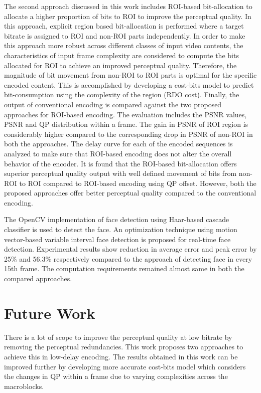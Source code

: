 The second approach discussed in this work includes ROI-based bit-allocation to allocate a higher proportion of bits to ROI to improve the perceptual quality. In this approach, explicit region based bit-allocation is performed where a target bitrate is assigned to ROI and non-ROI parts independently. In order to make this approach more robust across different classes of input video contents, the characteristics of input frame complexity are considered to compute the bits allocated for ROI to achieve an improved perceptual quality. Therefore, the magnitude of bit movement from non-ROI to ROI parts is optimal for the specific encoded content. This is accomplished by developing a cost-bits model to predict bit-consumption using the complexity of the region (RDO cost). Finally, the output of conventional encoding is compared against the two proposed approaches for ROI-based encoding. The evaluation includes the PSNR values, PSNR and QP distribution within a frame. The gain in PSNR of ROI region is considerably higher compared to the corresponding drop in PSNR of non-ROI in both the approaches. The delay curve for each of the encoded sequences is analyzed to make sure that ROI-based encoding does not alter the overall behavior of the encoder. It is found that the ROI-based bit-allocation offers superior perceptual quality output with well defined movement of bits from non-ROI to ROI compared to ROI-based encoding using QP offset. However, both the proposed approaches offer better perceptual quality compared to the conventional encoding.

The OpenCV implementation of face detection using Haar-based cascade classifier is used to detect the face. An optimization technique using motion vector-based variable interval face detection is proposed for real-time face detection. Experimental results show reduction in average error and peak error by 25\% and 56.3\% respectively compared to the approach of detecting face in every 15th frame. The computation requirements remained almost same in both the compared approaches.

\section{Future Work}
There is a lot of scope to improve the perceptual quality at low bitrate by removing the perceptual redundancies. This work proposes two approaches to achieve this in low-delay encoding. The results obtained in this work can be improved further by developing more accurate cost-bits model which considers the changes in QP within a frame due to varying complexities across the macroblocks. 

